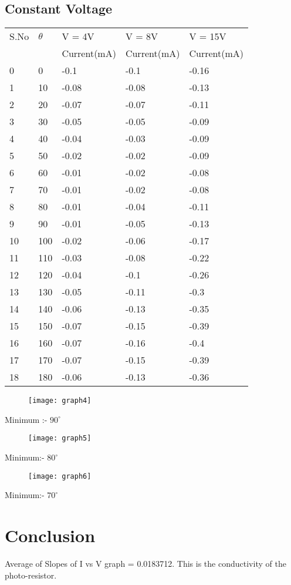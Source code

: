 \documentclass[
	letterpaper, %
	10pt, %
]{CSUniSchoolLabReport}
\begin{document}
	\subsection{Constant Voltage}
	\begin{center}
		\begin{tabular}{ | m{1cm} | m{1cm}| m{3cm} |m{3cm}  | m{3cm}|}
			\hline
			S.No&\(\theta\)  & V = 4V & V = 8V & V = 15V \\
			&&Current(mA)&Current(mA)&Current(mA)\\
			\hline

			0&0&-0.1&-0.1&-0.16\\
			1&10&-0.08&-0.08&-0.13\\
			2&20&-0.07&-0.07&-0.11\\
			3&30&-0.05&-0.05&-0.09\\
			4&40&-0.04&-0.03&-0.09\\
			5&50&-0.02&-0.02&-0.09\\
			6&60&-0.01&-0.02&-0.08\\
			7&70&-0.01&-0.02&-0.08\\
			8&80&-0.01&-0.04&-0.11\\
			9&90&-0.01&-0.05&-0.13\\
			10&100&-0.02&-0.06&-0.17\\
			11&110&-0.03&-0.08&-0.22\\
			12&120&-0.04&-0.1&-0.26\\
			13&130&-0.05&-0.11&-0.3\\
			14&140&-0.06&-0.13&-0.35\\
			15&150&-0.07&-0.15&-0.39\\
			16&160&-0.07&-0.16&-0.4\\
			17&170&-0.07&-0.15&-0.39\\
			18&180&-0.06&-0.13&-0.36\\
			\hline
		\end{tabular}
	\end{center}
	\begin{figure}[H] %
		\centering %
		\texttt{[image: graph4]} %
		\caption{}
	\end{figure}
	Minimum :- \(90^{\circ}\) 
	\begin{figure}[H] %
		\centering %
		\texttt{[image: graph5]} %
		\caption{}
	\end{figure}
	Minimum:- \(80^{\circ} \) 
	\begin{figure}[H] %
		\centering %
		\texttt{[image: graph6]} %
		\caption{}
	\end{figure}
	Minimum:- \(70^{\circ}\) 
	\section{Conclusion}
	Average of Slopes of I vs V graph = 0.0183712. This is the conductivity of the photo-resistor.
\end{document}
